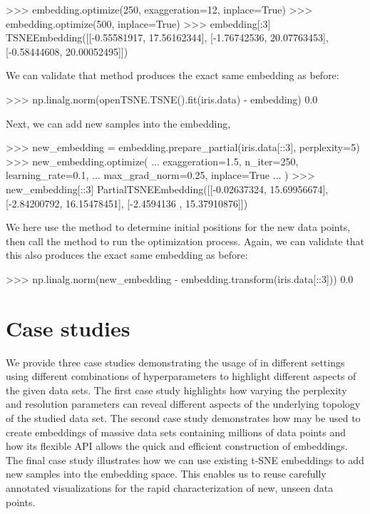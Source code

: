 \documentclass[article]{jss}
\newcommand{\opentsne}{\pkg{openTSNE}\xspace}
\begin{document}
\begin{CodeChunk}
\begin{CodeInput}
>>> embedding.optimize(250, exaggeration=12, inplace=True)
>>> embedding.optimize(500, inplace=True)
>>> embedding[:3]
TSNEEmbedding([[-0.55581917, 17.56162344],
               [-1.76742536, 20.07763453],
               [-0.58444608, 20.00052495]])
\end{CodeInput}
\end{CodeChunk}
We can validate that method produces the exact same embedding as before:
\begin{CodeChunk}
\begin{CodeInput}
>>> np.linalg.norm(openTSNE.TSNE().fit(iris.data) - embedding)
0.0
\end{CodeInput}
\end{CodeChunk}
Next, we can add new samples into the embedding,
\begin{CodeChunk}
\begin{CodeInput}
>>> new_embedding = embedding.prepare_partial(iris.data[::3], perplexity=5)
>>> new_embedding.optimize(
...     exaggeration=1.5, n_iter=250, learning_rate=0.1,
...     max_grad_norm=0.25, inplace=True
... )
>>> new_embedding[::3]
PartialTSNEEmbedding([[-0.02637324, 15.69956674],
                      [-2.84200792, 16.15478451],
                      [-2.4594136 , 15.37910876]])
\end{CodeInput}
\end{CodeChunk}
We here use the  method to determine initial positions for the new data points, then call the  method to run the optimization process. Again, we can validate that this also produces the exact same embedding as before:
\begin{CodeChunk}
\begin{CodeInput}
>>> np.linalg.norm(new_embedding - embedding.transform(iris.data[::3]))
0.0
\end{CodeInput}
\end{CodeChunk}

\section{Case studies} \label{sec:discussion}

We provide three case studies demonstrating the usage of \opentsne in different settings using different combinations of hyperparameters to highlight different aspects of the given data sets.
The first case study highlights how varying the perplexity and resolution parameters can reveal different aspects of the underlying topology of the studied data set.
The second case study demonstrates how \opentsne may be used to create embeddings of massive data sets containing millions of data points and how its flexible API allows the quick and efficient construction of embeddings.
The final case study illustrates how we can use existing t-SNE embeddings to add new samples into the embedding space. This enables us to reuse carefully annotated visualizations for the rapid characterization of new, unseen data points.
\end{document}
